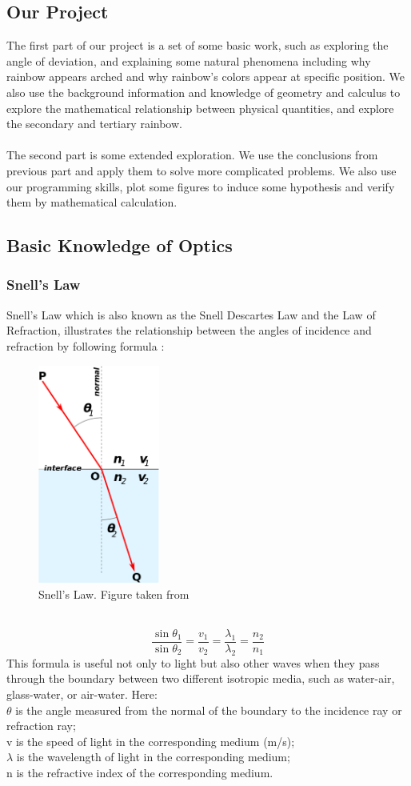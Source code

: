 \documentclass{article}
\begin{document}
\begin{spacing}{1.5}
\subsection{Our Project}
The first part of our project is a set of some basic work, such as exploring the angle of deviation, and explaining some natural phenomena including why rainbow appears arched and why rainbow's colors appear at specific position. We also use the background information and knowledge of geometry and calculus to explore the mathematical relationship between physical quantities, and explore the secondary and tertiary rainbow.\\
\\
The second part is some extended exploration. We use the conclusions from previous part and apply them to solve more complicated problems. We also use our programming skills, plot some figures to induce some hypothesis and verify them by mathematical calculation.
\subsection{Basic Knowledge of Optics}
\subsubsection{Snell's Law}
Snell's Law which is also known as the Snell Descartes Law and the Law of Refraction, illustrates the relationship between the angles of incidence and refraction by following formula \cite{Snell's Law}:
\begin{figure}[!htb]
\centering
\includegraphics[width=4cm]{snell.png}
\caption{Snell's Law. Figure taken from \cite{Snell's Law}}
\end{figure}
\\
$$\frac{\sin\theta_1}{\sin\theta _2}=\frac{v_1}{v_2}=\frac{\lambda_1}{\lambda_2}=\frac{n_2}{n_1}$$
This formula is useful not only to light but also other waves when they pass through the boundary between two different isotropic media, such as water-air, glass-water, or air-water. 
Here:\\
\indent $\theta$ is the angle measured from the normal of the boundary to the incidence ray or refraction ray;\\
\indent v is the speed of light in the corresponding medium (m/s);\\
\indent $\lambda$ is the wavelength of light in the corresponding medium;\\
\indent n is the refractive index of the corresponding medium.

\end{spacing}
\end{document}
